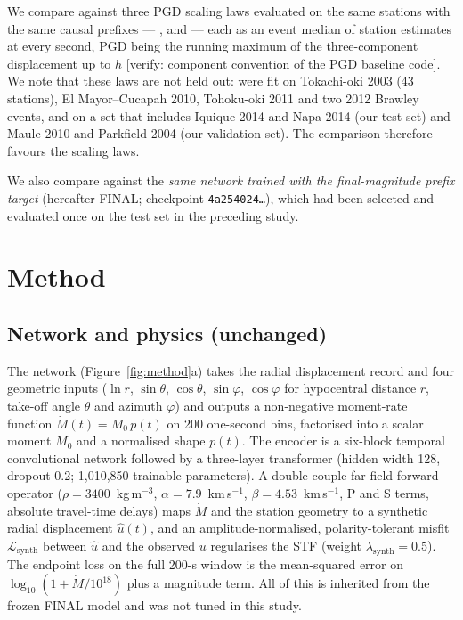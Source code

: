 \documentclass[12pt,letterpaper]{article}
\newcommand{\verify}[1]{\textcolor{orange!80!black}{[verify: #1]}}
\newcommand{\Mdot}{\dot{M}}
\begin{document}
We compare against three PGD scaling laws evaluated on the same stations with the same causal prefixes --- \citet{Crowell2013}, \citet{Melgar2015} and \citet{Ruhl2019} --- each as an event median of station estimates at every second, PGD being the running maximum of the three-component displacement up to $h$ \verify{component convention of the PGD baseline code}. We note that these laws are not held out: \citet{Crowell2013} were fit on Tokachi-oki 2003 (43 stations), El Mayor--Cucapah 2010, Tohoku-oki 2011 and two 2012 Brawley events, and \citet{Melgar2015} on a set that includes Iquique 2014 and Napa 2014 (our test set) and Maule 2010 and Parkfield 2004 (our validation set). The comparison therefore favours the scaling laws.

We also compare against the \emph{same network trained with the final-magnitude prefix target} (hereafter FINAL; checkpoint \texttt{4a254024\ldots}), which had been selected and evaluated once on the test set in the preceding study.

\section{Method}

\subsection{Network and physics (unchanged)}

The network (Figure~\ref{fig:method}a) takes the radial displacement record and four geometric inputs ($\ln r$, $\sin\theta$, $\cos\theta$, $\sin\varphi$, $\cos\varphi$ for hypocentral distance $r$, take-off angle $\theta$ and azimuth $\varphi$) and outputs a non-negative moment-rate function $\Mdot(t)=M_0\,p(t)$ on 200 one-second bins, factorised into a scalar moment $M_0$ and a normalised shape $p(t)$. The encoder is a six-block temporal convolutional network \citep{Bai2018} followed by a three-layer transformer \citep{Vaswani2017} (hidden width 128, dropout 0.2; 1,010,850 trainable parameters). A double-couple far-field forward operator ($\rho=3400$~kg\,m$^{-3}$, $\alpha=7.9$~km\,s$^{-1}$, $\beta=4.53$~km\,s$^{-1}$, P and S terms, absolute travel-time delays) maps $\Mdot$ and the station geometry to a synthetic radial displacement $\hat u(t)$, and an amplitude-normalised, polarity-tolerant misfit $\mathcal{L}_\mathrm{synth}$ between $\hat u$ and the observed $u$ regularises the STF (weight $\lambda_\mathrm{synth}=0.5$). The endpoint loss on the full 200-s window is the mean-squared error on $\log_{10}(1+\Mdot/10^{18})$ plus a magnitude term. All of this is inherited from the frozen FINAL model and was not tuned in this study.
\end{document}
